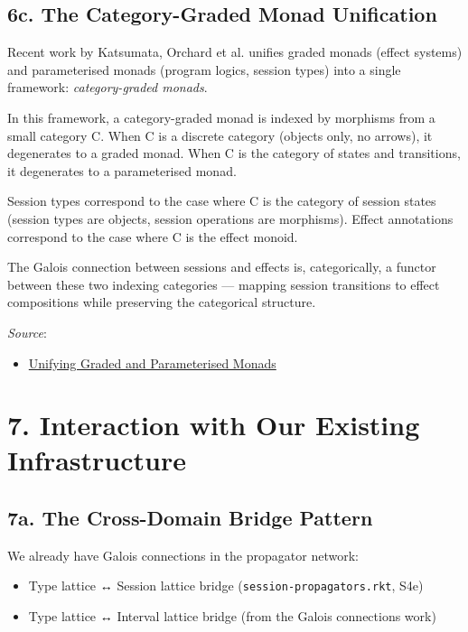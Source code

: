 \documentclass[11pt]{article}
\begin{document}
\subsection{6c. The Category-Graded Monad Unification}
\label{sec:org45b582e}

Recent work by Katsumata, Orchard et al. unifies graded monads (effect systems)
and parameterised monads (program logics, session types) into a single framework:
\emph{category-graded monads}.

In this framework, a category-graded monad is indexed by morphisms from a small
category C. When C is a discrete category (objects only, no arrows), it degenerates
to a graded monad. When C is the category of states and transitions, it degenerates
to a parameterised monad.

Session types correspond to the case where C is the category of session states
(session types are objects, session operations are morphisms). Effect annotations
correspond to the case where C is the effect monoid.

The Galois connection between sessions and effects is, categorically, a functor
between these two indexing categories — mapping session transitions to effect
compositions while preserving the categorical structure.

\emph{Source}:
\begin{itemize}
\item \href{https://arxiv.org/pdf/2001.10274}{Unifying Graded and Parameterised Monads}
\end{itemize}
\section{7. Interaction with Our Existing Infrastructure}
\label{sec:org45adc9e}

\subsection{7a. The Cross-Domain Bridge Pattern}
\label{sec:orgdb38f49}

We already have Galois connections in the propagator network:
\begin{itemize}
\item Type lattice ↔ Session lattice bridge (\texttt{session-propagators.rkt}, S4e)
\item Type lattice ↔ Interval lattice bridge (from the Galois connections work)
\end{itemize}
\end{document}
